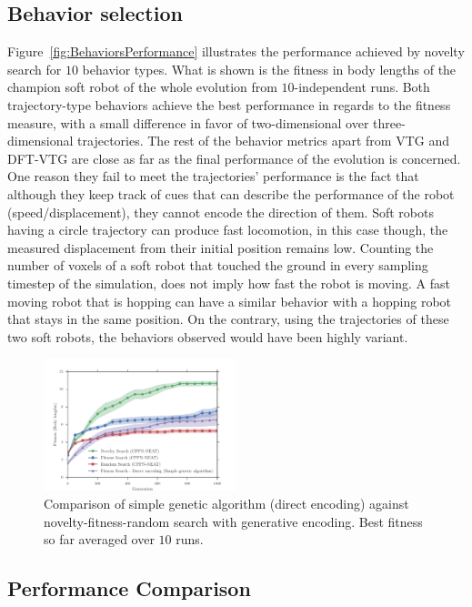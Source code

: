 \documentclass{sig-alternate}
\begin{document}
\subsection{Behavior selection} 

Figure~\ref{fig:BehaviorsPerformance} illustrates the performance achieved by novelty search for $10$ behavior types. What is shown is the fitness in body lengths of the champion soft robot of the whole evolution from $10$-independent runs. Both trajectory-type behaviors achieve the best performance in regards to the fitness measure, with a small difference in favor of two-dimensional over three-dimensional trajectories. The rest of the behavior metrics apart from VTG and DFT-VTG are close as far as the final performance of the evolution is concerned. One reason they fail to meet the trajectories' performance is the fact that although they keep track of cues that can describe the performance of the robot (speed/displacement), they cannot encode the direction of them. Soft robots having a circle trajectory can produce fast locomotion, in this case though, the measured displacement from their initial position remains low. Counting the number of voxels of a soft robot that touched the ground in every sampling timestep of the simulation, does not imply how fast the robot is moving. A fast moving robot that is hopping can have a similar behavior with a hopping robot that stays in the same position. On the contrary, using the trajectories of these two soft robots, the behaviors observed would have been highly variant.


\begin{figure}[b!]
\centering
\includegraphics[width=0.5\textwidth]{../Figures/Results/FitNovRandomDirectSize5.pdf}
\caption{Comparison of simple genetic algorithm (direct encoding) against novelty-fitness-random search with generative encoding. Best fitness so far averaged over $10$ runs.}
\label{fig:FitNovRandomDirectSize5}
\vspace{-15pt}
\end{figure}

\subsection{Performance Comparison}
\end{document}

